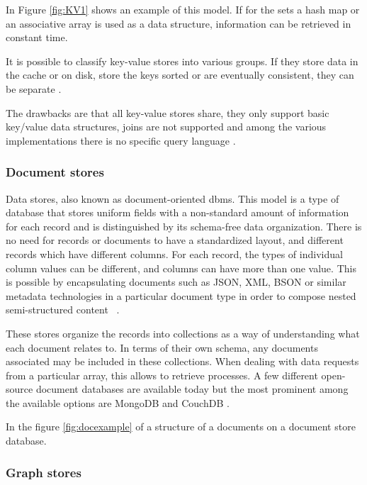 In Figure \ref{fig:KV1} shows an example of this model. If for the sets a hash map or an associative array is used as a data structure, information can be retrieved in constant time.



It is possible to classify key-value stores into various groups. If they store data in the cache or on disk, store the keys sorted or are eventually consistent, they can be separate \cite{sabrina1448}.
 
The drawbacks are that all key-value stores share, they only support basic key/value data structures, joins are not supported and among the various implementations there is no specific query language \cite{sabrina1448}.

\subsubsection{Document stores}

Data stores, also known as document-oriented \gls{dbms}. This model is a type of database that stores uniform fields with a non-standard amount of information for each record and is distinguished by its schema-free data organization. There is no need for records or documents to have a standardized layout, and different records which have different columns. For each record, the types of individual column values can be different, and columns can have more than one value. This is possible by encapsulating documents such as JSON, XML, BSON or similar metadata technologies in a particular document type in order to compose nested semi-structured content ~\cite{nosqlchoose,sabrina1448,tiwari_2011,wuoverview,vera2015data}.

These stores organize the records into collections as a way of understanding what each document relates to. In terms of their own schema, any documents associated may be included in these collections. When dealing with data requests from a particular array, this allows to retrieve processes. A few different open-source document databases are available today but the most prominent among the available options are MongoDB and CouchDB \cite{nosqlchoose,tiwari_2011}.

In the figure \ref{fig:docexample} of a structure of a documents on a document store database.



\subsubsection{Graph stores}

